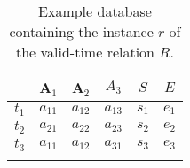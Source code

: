 \begin{table}[h]
\centering
\caption[Example database for $r \in R$]{\label{tbl:sample-definitions}Example database containing the instance $r$ of the valid-time relation $R$.}
\vspace{2mm}
\begin{tabular}{c c c c c c}\\
\hline
& \textbf{A$_1$}  & \textbf{A$_2$}  & $A_3$ & $S$ & $E$ \\
\hline
$t_1$&$a_{11}$ & $a_{12}$ & $a_{13}$ & $s_1$ & $e_1$ \\
$t_2$ & $a_{21}$ & $a_{22}$ & $a_{23}$ &  $s_2$ & $e_2$ \\
$t_3$ & $a_{11}$ & $a_{12}$ & $a_{31}$ & $s_3$ & $e_3$\\
\hline\\
\end{tabular}
\end{table}

